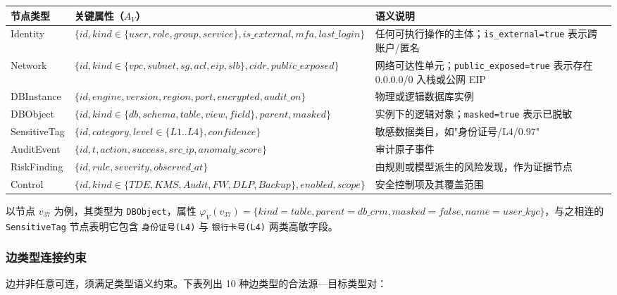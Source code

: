 \documentclass[a4paper,12pt]{ctexart}
\begin{document}
\begin{table}[htbp]
\centering
\small
\setlength{\tabcolsep}{4pt}
\begin{tabular}{|l|l|l|}
\hline
\textbf{节点类型} & \textbf{关键属性（$A_V$）} & \textbf{语义说明} \\
\hline
Identity & $\{id, kind \in \{user, role, group, service\}, is\_external, mfa, last\_login\}$ & 任何可执行操作的主体；\texttt{is\_external=true} 表示跨账户/匿名 \\
\hline
Network & $\{id, kind \in \{vpc, subnet, sg, acl, eip, slb\}, cidr, public\_exposed\}$ & 网络可达性单元；\texttt{public\_exposed=true} 表示存在 0.0.0.0/0 入栈或公网 EIP \\
\hline
DBInstance & $\{id, engine, version, region, port, encrypted, audit\_on\}$ & 物理或逻辑数据库实例 \\
\hline
DBObject & $\{id, kind \in \{db, schema, table, view, field\}, parent, masked\}$ & 实例下的逻辑对象；\texttt{masked=true} 表示已脱敏 \\
\hline
SensitiveTag & $\{id, category, level \in \{L1..L4\}, confidence\}$ & 敏感数据类目，如"身份证号/L4/0.97" \\
\hline
AuditEvent & $\{id, t, action, success, src\_ip, anomaly\_score\}$ & 审计原子事件 \\
\hline
RiskFinding & $\{id, rule, severity, observed\_at\}$ & 由规则或模型派生的风险发现，作为证据节点 \\
\hline
Control & $\{id, kind \in \{TDE, KMS, Audit, FW, DLP, Backup\}, enabled, scope\}$ & 安全控制项及其覆盖范围 \\
\hline
\end{tabular}
\end{table}

以节点 $v_{37}$ 为例，其类型为 \texttt{DBObject}，属性 $\varphi_V(v_{37}) = \{kind=table, parent=db\_crm, masked=false, name=user\_kyc\}$，与之相连的 \texttt{SensitiveTag} 节点表明它包含 \texttt{身份证号(L4)} 与 \texttt{银行卡号(L4)} 两类高敏字段。

\subsubsection{边类型连接约束}

边并非任意可连，须满足类型语义约束。下表列出 10 种边类型的合法源—目标类型对：
\end{document}
